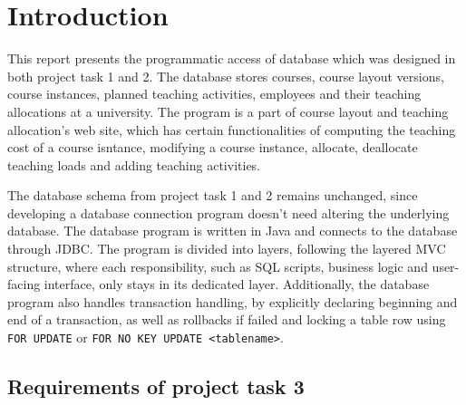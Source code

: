 \documentclass[a4paper]{scrartcl}
\renewcommand{\_}{\textunderscore\allowbreak}
\begin{document}



\section{Introduction}
\label{sec:introduction}


This report presents the programmatic access of database which was designed in both project task 1 and 2. The database stores courses, course layout versions, course instances, planned teaching activities, employees and their teaching allocations at a university. The program is a part of course layout and teaching allocation's web site, which has certain functionalities of computing the teaching cost of a course isntance, modifying a course instance, allocate, deallocate teaching loads and adding teaching activities.

The database schema from project task 1 and 2 remains unchanged, since developing a database connection program doesn't need altering the underlying database. The database program is written in Java and connects to the database through JDBC. The program is divided into layers, following the layered MVC structure, where each responsibility, such as SQL scripts, business logic and user-facing interface, only stays in its dedicated layer. Additionally, the database program also handles transaction handling, by explicitly declaring beginning and end of a transaction, as well as rollbacks if failed and locking a table row using \texttt{FOR UPDATE} or \texttt{FOR NO KEY UPDATE <table\_name>}.

\subsection{Requirements of project task 3}
\label{sec:requirements}
\end{document}
